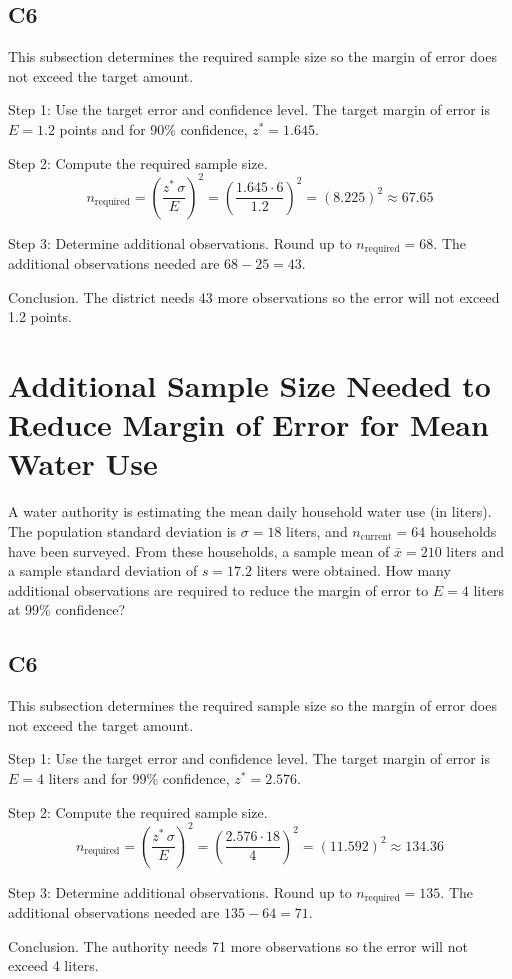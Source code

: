 \begin{ExamProblems}
		\subsection*{C6}
		This subsection determines the required sample size so the margin of error does not exceed the target amount.
		
		Step 1: Use the target error and confidence level. The target margin of error is $E = 1.2$ points and for 90\% confidence, $z^* = 1.645$.
		
		Step 2: Compute the required sample size.
		\[
		n_{\text{required}} = \left(\frac{z^*\,\sigma}{E}\right)^2
		= \left(\frac{1.645 \cdot 6}{1.2}\right)^2
		= \left(8.225\right)^2
		\approx 67.65
		\]
		
		Step 3: Determine additional observations. Round up to $n_{\text{required}} = 68$. The additional observations needed are $68 - 25 = 43$.
		
		Conclusion. The district needs 43 more observations so the error will not exceed 1.2 points.
		
		\item
		\section{Additional Sample Size Needed to Reduce Margin of Error for Mean Water Use}
		A water authority is estimating the mean daily household water use (in liters). The population standard deviation is $\sigma = 18$ liters, and $n_{\text{current}} = 64$ households have been surveyed. From these households, a sample mean of $\bar{x} = 210$ liters and a sample standard deviation of $s = 17.2$ liters were obtained. How many additional observations are required to reduce the margin of error to $E = 4$ liters at 99\% confidence?
		
		\subsection*{C6}
		This subsection determines the required sample size so the margin of error does not exceed the target amount.
		
		Step 1: Use the target error and confidence level. The target margin of error is $E = 4$ liters and for 99\% confidence, $z^* = 2.576$.
		
		Step 2: Compute the required sample size.
		\[
		n_{\text{required}} = \left(\frac{z^*\,\sigma}{E}\right)^2
		= \left(\frac{2.576 \cdot 18}{4}\right)^2
		= \left(11.592\right)^2
		\approx 134.36
		\]
		
		Step 3: Determine additional observations. Round up to $n_{\text{required}} = 135$. The additional observations needed are $135 - 64 = 71$.
		
		Conclusion. The authority needs 71 more observations so the error will not exceed 4 liters.
		
	\end{ExamProblems}

